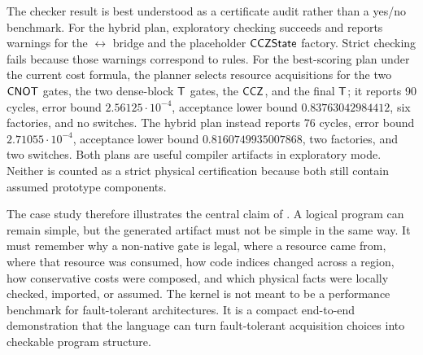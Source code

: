 The checker result is best understood as a certificate audit rather than a yes/no benchmark.
For the hybrid plan, exploratory checking succeeds and reports warnings for the $\leftrightarrow$ bridge and the placeholder $\mathsf{CCZState}$ factory.
Strict checking fails because those warnings correspond to \Assumed{} rules.
For the best-scoring plan under the current cost formula, the planner selects resource acquisitions for the two $\mathsf{CNOT}$ gates, the two dense-block $\mathsf{T}$ gates, the $\mathsf{CCZ}$, and the final $\mathsf{T}$; it reports 90 cycles, error bound $2.56125\cdot 10^{-4}$, acceptance lower bound $0.83763042984412$, six factories, and no switches.
The hybrid plan instead reports 76 cycles, error bound $2.71055\cdot 10^{-4}$, acceptance lower bound $0.8160749935007868$, two factories, and two switches.
Both plans are useful compiler artifacts in exploratory mode.
Neither is counted as a strict physical certification because both still contain assumed prototype components.

The case study therefore illustrates the central claim of \system.
A logical program can remain simple, but the generated artifact must not be simple in the same way.
It must remember why a non-native gate is legal, where a resource came from, where that resource was consumed, how code indices changed across a region, how conservative costs were composed, and which physical facts were locally checked, imported, or assumed.
The  kernel is not meant to be a performance benchmark for fault-tolerant architectures.
It is a compact end-to-end demonstration that the language can turn fault-tolerant acquisition choices into checkable program structure.
